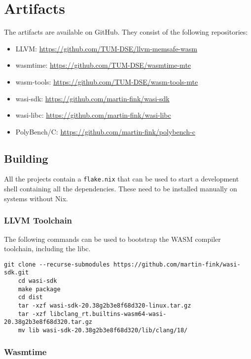 \chapter{Artifacts}
\label{ch:artifacts}

The artifacts are available on GitHub.
They consist of the following repositories:

\begin{itemize}
    \item LLVM: \url{https://github.com/TUM-DSE/llvm-memsafe-wasm}
    \item wasmtime: \url{https://github.com/TUM-DSE/wasmtime-mte}
    \item wasm-tools: \url{https://github.com/TUM-DSE/wasm-tools-mte}
    \item wasi-sdk: \url{https://github.com/martin-fink/wasi-sdk}
    \item wasi-libc: \url{https://github.com/martin-fink/wasi-libc}
    \item PolyBench/C: \url{https://github.com/martin-fink/polybench-c}
\end{itemize}


\section{Building}
\label{sec:building}

All the projects contain a \texttt{flake.nix} that can be used to start a development shell containing all the dependencies.
These need to be installed manually on systems without Nix.

\subsection{LLVM Toolchain}
\label{subsec:llvm-toolchain}

The following commands can be used to bootstrap the \ac{WASM} compiler toolchain, including the libc.

\begin{lstlisting}[label={lst:building-sdk}]
    git clone --recurse-submodules https://github.com/martin-fink/wasi-sdk.git
    cd wasi-sdk
    make package
    cd dist
    tar -xzf wasi-sdk-20.38g2b3e8f68d320-linux.tar.gz
    tar -xzf libclang_rt.builtins-wasm64-wasi-20.38g2b3e8f68d320.tar.gz
    mv lib wasi-sdk-20.38g2b3e8f68d320/lib/clang/18/
\end{lstlisting}

\subsection{Wasmtime}
\label{subsec:building-wasmtime}

